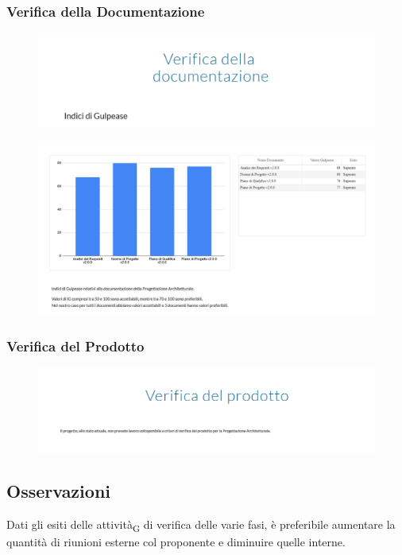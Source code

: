 \subsubsection{Verifica della Documentazione}
\begin{figure}[H]
	\includegraphics[scale=0.5]{res/images/cruscotto/pa_8.png}
\end{figure}
\begin{figure}[H]
	\includegraphics[scale=0.5]{res/images/cruscotto/pa_9.png}
\end{figure}
\subsubsection{Verifica del Prodotto}
\begin{figure}[H]
	\includegraphics[scale=0.5]{res/images/cruscotto/pa_10.png}
\end{figure}
\pagebreak
\subsection{Osservazioni}
Dati gli esiti delle attività\textsubscript{G} di verifica delle varie fasi, è preferibile aumentare la quantità di riunioni esterne col proponente e diminuire quelle interne.
